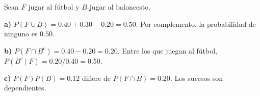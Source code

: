 Sean $F$ jugar al fútbol y $B$ jugar al baloncesto.

\textbf{a)} $P(F\cup B)=0.40+0.30-0.20=0.50$.
Por complemento, la probabilidad de ninguno es $\boxed{0.50}$.

\textbf{b)} $P(F\cap B^c)=0.40-0.20=0.20$.
Entre los que juegan al fútbol, $P(B^c\mid F)=0.20/0.40=\boxed{0.50}$.

\textbf{c)} $P(F)P(B)=0.12$ difiere de $P(F\cap B)=0.20$.
Los sucesos son dependientes.
